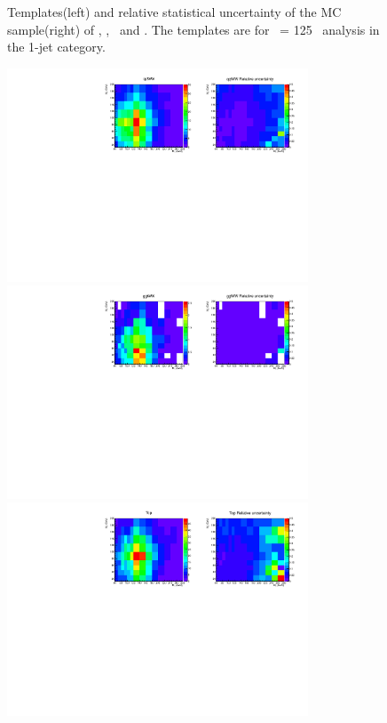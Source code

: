 \begin{figure}[htp]
\caption{Templates(left) and relative statistical uncertainty of the MC sample(right) 
of \qqWH, \qqZH, \qqH\ and \ggH. 
The templates are for \mHi\ = 125 \GeV\ analysis in the 1-jet category.}
\label{fig:2dtemplate_125_1j_1}
\end{figure}

\begin{figure}[htp]
\centering
\includegraphics[width=0.8\textwidth]{figures/2dtemplate_qqWW_mH125_1j.pdf}
\includegraphics[width=0.8\textwidth]{figures/2dtemplate_ggWW_mH125_1j.pdf}
\includegraphics[width=0.8\textwidth]{figures/2dtemplate_Top_mH125_1j.pdf}

\end{figure}
